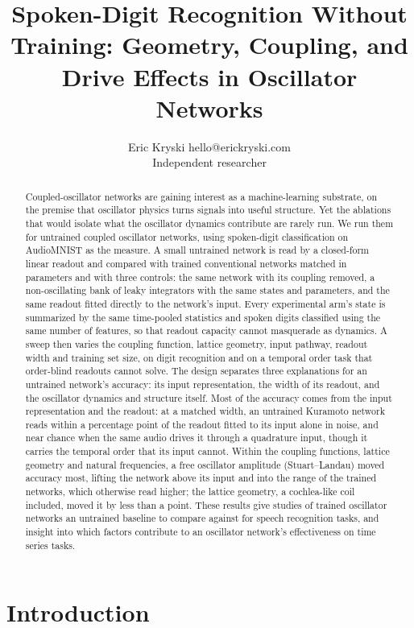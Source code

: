 \documentclass[10pt]{article}
\title{Spoken-Digit Recognition Without Training: Geometry, Coupling,
and Drive Effects in Oscillator Networks}
\author{\name Eric Kryski \email hello@erickryski.com \\
      \addr Independent researcher}
\date{}
\makeatletter
\newcommand{\tmlr@floatbarrier}{\par\vspace{\z@}%
  \ifx\@deferlist\@empty\else\clearpage\fi}
\let\tmlr@section\section
\renewcommand{\section}{\tmlr@floatbarrier\tmlr@section}
\makeatother
\begin{document}
\maketitle
\begin{abstract}
Coupled-oscillator networks are gaining interest as a machine-learning
substrate, on the premise that oscillator physics turns signals into
useful structure. Yet the ablations that would isolate what the
oscillator dynamics contribute are rarely run. We run them for untrained
coupled oscillator networks, using spoken-digit classification on
AudioMNIST as the measure. A small untrained network is read by a
closed-form linear readout and compared with trained conventional
networks matched in parameters and with three controls: the same network
with its coupling removed, a non-oscillating bank of leaky integrators
with the same states and parameters, and the same readout fitted
directly to the network's input. Every experimental arm's state is
summarized by the same time-pooled statistics and spoken digits
classified using the same number of features, so that readout capacity
cannot masquerade as dynamics. A sweep then varies the coupling
function, lattice geometry, input pathway, readout width and training
set size, on digit recognition and on a temporal order task that
order-blind readouts cannot solve. The design separates three
explanations for an untrained network's accuracy: its input
representation, the width of its readout, and the oscillator dynamics
and structure itself. Most of the accuracy comes from the input
representation and the readout: at a matched width, an untrained
Kuramoto network reads within a percentage point of the readout fitted
to its input alone in noise, and near chance when the same audio drives
it through a quadrature input, though it carries the temporal order that
its input cannot. Within the coupling functions, lattice geometry and
natural frequencies, a free oscillator amplitude (Stuart--Landau) moved
accuracy most, lifting the network above its input and into the range of
the trained networks, which otherwise read higher; the lattice geometry,
a cochlea-like coil included, moved it by less than a point. These
results give studies of trained oscillator networks an untrained
baseline to compare against for speech recognition tasks, and insight
into which factors contribute to an oscillator network's effectiveness
on time series tasks.
\end{abstract}

\section{Introduction}\label{introduction}
\end{document}
